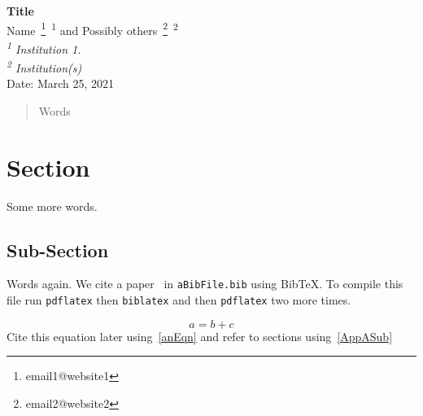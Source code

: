 



\begin{center}
{\bf Title} \bsk\\
    Name~\footnote{email1@website1}~\textsuperscript{1} 
    and Possibly others~\footnote{email2@website2}~\textsuperscript{2}\\
{\em \textsuperscript{1} Institution 1.}\\
{\em \textsuperscript{2} Institution(s)}\\
Date: March 25, 2021
\end{center}

\begin{abstract}
Words
\end{abstract}

\section{Section}
\label{Label1}
\xb
{}
\xa

Some more words.

\subsection{Sub-Section}
\label{Label2}
\xb
{}
\xa

Words again. We cite a paper~\cite{AuthorYear} in {\tt aBibFile.bib} using
BibTeX. To compile this file run {\tt pdflatex} then {\tt biblatex} and
then {\tt pdflatex} two more times.

\begin{equation}
    a = b + c
    \label{anEqn}
\end{equation}
%
Cite this equation later using~\eqref{anEqn} and refer to sections
using~\ref{AppASub}






